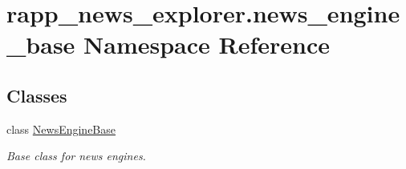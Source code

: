 \hypertarget{namespacerapp__news__explorer_1_1news__engine__base}{\section{rapp\-\_\-news\-\_\-explorer.\-news\-\_\-engine\-\_\-base Namespace Reference}
\label{namespacerapp__news__explorer_1_1news__engine__base}
}
\subsection*{Classes}
\begin{DoxyCompactItemize}
\item 
class \hyperlink{classrapp__news__explorer_1_1news__engine__base_1_1NewsEngineBase}{News\-Engine\-Base}
\begin{DoxyCompactList}\small\item\em Base class for news engines. \end{DoxyCompactList}\end{DoxyCompactItemize}
